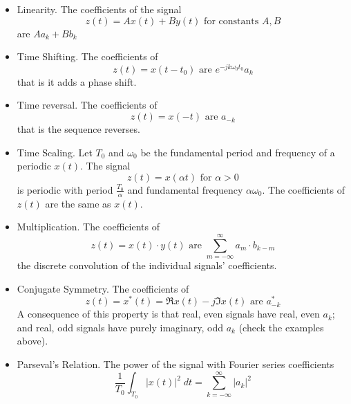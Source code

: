 \begin{itemize}
\item Linearity. The coefficients of the signal
  \[
  z(t) = Ax(t) + By(t) \mbox{ for constants } A,B 
  \]
  are $Aa_k + Bb_k$
\item Time Shifting. The coefficients of
  \[
  z(t) = x(t-t_0) \mbox{ are } e^{-jk\omega_0 t_0}a_k
  \]
  that is it adds a phase shift.
\item Time reversal. The coefficients of
  \[
  z(t) = x(-t) \mbox{ are } a_{-k}
  \]
  that is the sequence reverses.
\item Time Scaling. Let $T_0$ and $\omega_0$ be the fundamental period and frequency of a periodic $x(t)$. The signal 
  \[
  z(t) = x(\alpha t) \mbox{ for } \alpha > 0
  \]
  is periodic with period $\frac{T_0}{\alpha}$ and fundamental frequency $\alpha\omega_0$.
  The coefficients of $z(t)$ are the same as $x(t)$.
\item Multiplication. The coefficients of
  \[
  z(t) = x(t) \cdot y(t) \mbox{ are } \sum\limits_{m = -\infty}^{\infty} a_m\cdot b_{k-m}
  \]
  the discrete convolution of the individual signals' coefficients.
\item Conjugate Symmetry. The coefficients of
  \[
  z(t) = x^*(t) = \Re{x(t)} - j\Im{x(t)} \mbox{ are } a_{-k}^*
  \]
  A consequence of this property is that real, even signals have real, even $a_k$; and real, odd signals have purely imaginary, odd $a_k$ (check the examples above).
\item Parseval's Relation. The power of the signal with Fourier series coefficients
  \[
  \frac{1}{T_0} \int_{T_0} |x(t)|^2\;dt = \sum\limits_{k = -\infty}^{\infty} |a_k|^2
  \]
\end{itemize}
